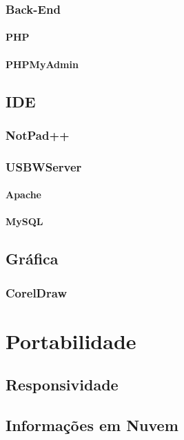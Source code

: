 \documentclass[12pt,a4paper]{book}
\begin{document}
\subsection{Back-End}
\subsubsection{PHP}

\subsubsection{PHPMyAdmin}

\section{IDE}
\subsection{NotPad++}

\subsection{USBWServer}
\subsubsection{Apache}

\subsubsection{MySQL}

\section{Gráfica}
\subsection{CorelDraw}


\chapter{Portabilidade}

\section{Responsividade}


\section{Informações em Nuvem}






\printindex
\end{document}
